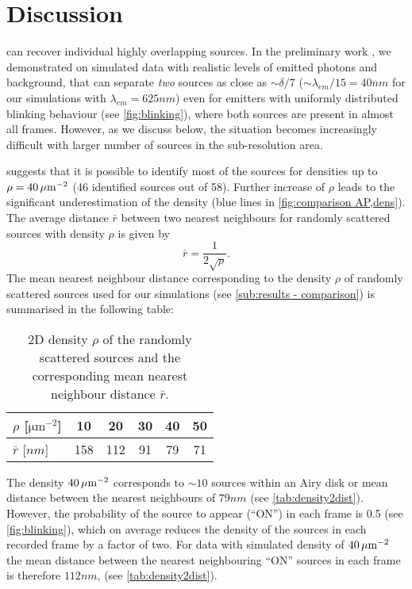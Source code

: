 
\clearpage
\section{Discussion\label{sec:Discussion}}

\inmf{} can recover individual highly overlapping sources. In the preliminary work \cite{Mandula2010b}, we demonstrated on simulated data with realistic levels of emitted photons and background, that \inmf{} can separate \emph{two} sources as close as $\sim \delta/7$ ($\sim \lambda_{em}/15 = 40 \unit{nm}$ for our simulations with $\lambda_{em}=625 \unit{nm}$) even for emitters with uniformly distributed blinking behaviour (see \autoref{fig:blinking}\aaa), where both sources are present in almost all frames. However, as we discuss below, the situation becomes increasingly difficult with larger number of sources in the sub-resolution area.

 suggests that it is possible to identify most of the sources for densities up to $\rho=40\, \mathrm{\mu m}^{-2}$ (46 identified sources out of 58). Further increase of $\rho$ leads to the significant underestimation of the density (blue lines in \autoref{fig:comparison AP,dens}\aaa). The average distance $\bar{r}$ between two nearest neighbours for randomly scattered sources with density $\rho$ is given by \cite{Frieden1991}
%
\begin{equation}
	\bar{r}=\frac{1}{2\sqrt{\rho}}.
\end{equation}
%
The mean nearest neighbour distance corresponding to the density $\rho$ of randomly scattered sources used for our simulations (see \autoref{sub:results - comparison}) is summarised in the following table:
%
\begin{table}[!h]
	\centering
	\begin{tabular}{l|ccccc}
		$\rho$ [$\unit{\um^{-2}}$]		& 10		& 20		& 30		& 40		& 50\\ \hline
		$\bar{r}$ [$\unit{nm}$]		& 158	& 112	& 91		& 79		& 71
	\end{tabular}
	\caption{2D density $\rho$ of the randomly scattered sources and the corresponding mean nearest neighbour distance $\bar{r}$.\label{tab:density2dist}}
\end{table}

The density $40\, \mathrm{\mu m}^{-2}$ corresponds to $\sim 10$ sources within an Airy disk or mean distance between the nearest neighbours of $79\unit{nm}$ (see \autoref{tab:density2dist}). However, the probability of the source to appear (``ON'') in each frame is 0.5 (see \autoref{fig:blinking}\ddd), which on average reduces the density of the sources in each recorded frame by a factor of two. For data with simulated density of $40\, \mathrm{\mu m}^{-2}$ the mean distance between the nearest neighbouring ``ON'' sources in each frame is therefore $112 \unit{nm}$, (see \autoref{tab:density2dist}).  


